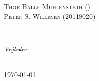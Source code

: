 \begin{titlingpage}
\begin{minipage}{0.55\textwidth}
\begin{flushleft}
 \textsc{Thor Balle Mühlensteth ()}\\ %
 \textsc{Peter S. Willesen (20118020)}\\ %

\end{flushleft}
\end{minipage}
~
\begin{minipage}{0.35\textwidth}
\begin{flushright} \large
\emph{Vejleder:} \\


\end{flushright}
\end{minipage}\\[2cm]



{\large \today}\\[2cm] %


 

\vfill %

\end{titlingpage}
